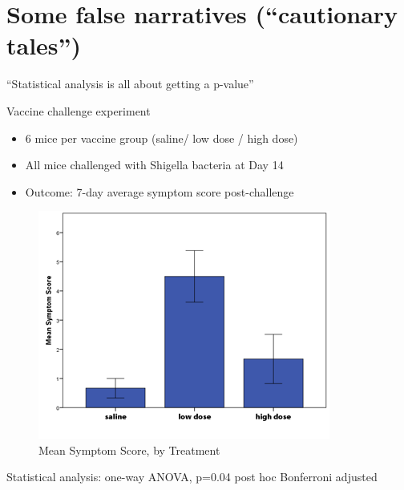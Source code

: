 \documentclass[
  12pt,
  ignorenonframetext,
  aspectratio=169,
]{beamer}
\providecommand{\tightlist}{%
  \setlength{\itemsep}{0pt}\setlength{\parskip}{0pt}}
\begin{document}
\hypertarget{some-false-narratives-cautionary-tales}{%
\section{Some false narratives (``cautionary
tales'')}\label{some-false-narratives-cautionary-tales}}

\begin{frame}{``Statistical analysis is all about getting a p-value''}
\protect\hypertarget{statistical-analysis-is-all-about-getting-a-p-value}{}

\begin{block}{Vaccine challenge experiment}

\begin{itemize}
\tightlist
\item
  6 mice per vaccine group (saline/ low dose / high dose)
\item
  All mice challenged with Shigella bacteria at Day 14
\item
  Outcome: 7-day average symptom score post-challenge
\end{itemize}

\begin{figure}

\hfill{}\includegraphics[width=0.5\linewidth,height=0.5\textheight]{../images/Lecture1_barplot} 

\caption{Mean Symptom Score, by Treatment}\label{fig:unnamed-chunk-2}
\end{figure}

\begin{block}{Statistical analysis: one-way ANOVA, p=0.04 post hoc
Bonferroni adjusted}

\end{block}

\end{block}

\end{frame}
\end{document}
